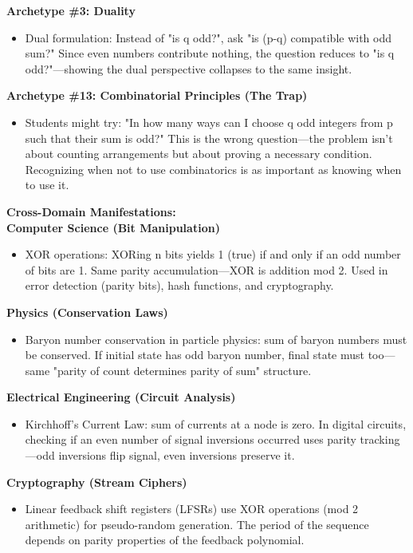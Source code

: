 \documentclass{article}
\begin{document}
\textbf{Archetype \#3: Duality}
\begin{itemize}
    \item Dual formulation: Instead of "is q odd?", ask "is (p-q) compatible with odd sum?" Since even numbers contribute nothing, the question reduces to "is q odd?"—showing the dual perspective collapses to the same insight.
\end{itemize}
\textbf{Archetype \#13: Combinatorial Principles (The Trap)}
\begin{itemize}
    \item Students might try: "In how many ways can I choose q odd integers from p such that their sum is odd?" This is the wrong question—the problem isn't about counting arrangements but about proving a necessary condition. Recognizing when not to use combinatorics is as important as knowing when to use it.
\end{itemize}
\textbf{Cross-Domain Manifestations:} \\
\textbf{Computer Science (Bit Manipulation)}
\begin{itemize}
    \item XOR operations: XORing n bits yields 1 (true) if and only if an odd number of bits are 1. Same parity accumulation—XOR is addition mod 2. Used in error detection (parity bits), hash functions, and cryptography.
\end{itemize}
\textbf{Physics (Conservation Laws)}
\begin{itemize}
    \item Baryon number conservation in particle physics: sum of baryon numbers must be conserved. If initial state has odd baryon number, final state must too—same "parity of count determines parity of sum" structure.
\end{itemize}
\textbf{Electrical Engineering (Circuit Analysis)}
\begin{itemize}
    \item Kirchhoff's Current Law: sum of currents at a node is zero. In digital circuits, checking if an even number of signal inversions occurred uses parity tracking—odd inversions flip signal, even inversions preserve it.
\end{itemize}
\textbf{Cryptography (Stream Ciphers)}
\begin{itemize}
    \item Linear feedback shift registers (LFSRs) use XOR operations (mod 2 arithmetic) for pseudo-random generation. The period of the sequence depends on parity properties of the feedback polynomial.
\end{itemize}
\end{document}
